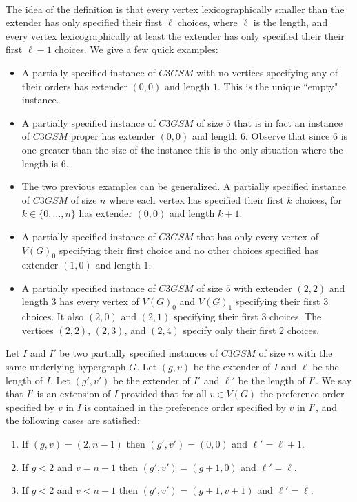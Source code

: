 \paragraph{}
The idea of the definition is that every vertex lexicographically smaller than the extender has only specified their first $\ell$ choices, where $\ell$ is the length, and every vertex lexicographically at least the extender has only specified their their first $\ell-1$ choices. We give a few quick examples:
\begin{itemize}
\item A partially specified instance of $C3GSM$ with no vertices specifying any of their orders has extender $(0,0)$ and length $1$. This is the unique ``empty" instance.
\item A partially specified instance of $C3GSM$ of size $5$ that is in fact an instance of $C3GSM$ proper has extender $(0,0)$ and length $6$. Observe that since $6$ is one greater than the size of the instance this is the only situation where the length is $6$.
\item The two previous examples can be generalized. A partially specified instance of $C3GSM$ of size $n$ where each vertex has specified their first $k$ choices, for $k \in \{0, \dots, n\}$ has extender $(0,0)$ and length $k+1$.
\item A partially specified instance of $C3GSM$ that has only every vertex of $V(G)_0$ specifying their first choice and no other choices specified has extender $(1,0)$ and length $1$.
\item A partially specified instance of $C3GSM$ of size $5$ with extender $(2,2)$ and length $3$ has every vertex of $V(G)_0$ and $V(G)_1$ specifying their first $3$ choices. It also $(2,0)$ and $(2,1)$ specifying their first $3$ choices. The vertices $(2,2)$, $(2,3)$, and $(2,4)$ specify only their first $2$ choices.
\end{itemize}
\begin{definition}
Let $I$ and $I'$ be two partially specified instances of $C3GSM$ of size $n$ with the same underlying hypergraph $G$. Let $(g,v)$ be the extender of $I$ and $\ell$ be the length of $I$. Let $(g',v')$ be the extender of $I'$ and $\ell'$ be the length of $I'$. We say that $I'$ is an extension of $I$ provided that for all $v \in V(G)$ the preference order specified by $v$ in $I$ is contained in the preference order specified by $v$ in $I'$, and the following cases are satisfied:
\begin{enumerate}
\item If $(g,v) = (2,n-1)$ then $(g',v') = (0,0)$ and $\ell' = \ell + 1$.
\item If $g < 2$ and $v = n-1$ then $(g',v') = (g+1, 0)$ and $\ell' = \ell$.
\item If $g<2$ and $v<n-1$ then $(g',v') = (g+1, v+1)$ and $\ell' = \ell$.
\end{enumerate}
\end{definition}
